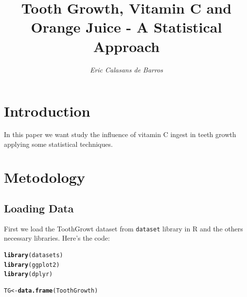 \documentclass[a4paper, 12pt]{article}\usepackage[]{graphicx}\usepackage[]{color}
\title{\textbf{Tooth Growth, Vitamin C and Orange Juice - A Statistical Approach}}
\author{\textit{Eric Calasans de Barros}}
\makeatletter
\newcommand{\hlstd}[1]{\textcolor[rgb]{0.345,0.345,0.345}{#1}}%
\newcommand{\hlkwb}[1]{\textcolor[rgb]{0.69,0.353,0.396}{#1}}%
\newcommand{\hlkwd}[1]{\textcolor[rgb]{0.737,0.353,0.396}{\textbf{#1}}}%
\newenvironment{kframe}{%
 \def\at@end@of@kframe{}%
 \ifinner\ifhmode%
  \def\at@end@of@kframe{\end{minipage}}%
  \begin{minipage}{\columnwidth}%
 \fi\fi%
 \def\FrameCommand##1{\hskip\@totalleftmargin \hskip-\fboxsep
 \colorbox{shadecolor}{##1}\hskip-\fboxsep
     \hskip-\linewidth \hskip-\@totalleftmargin \hskip\columnwidth}%
 \MakeFramed {\advance\hsize-\width
   \@totalleftmargin\z@ \linewidth\hsize
   \@setminipage}}%
 {\par\unskip\endMakeFramed%
 \at@end@of@kframe}
\newenvironment{knitrout}{}{} %
\makeatother
\begin{document}
        \maketitle
        \section{Introduction}
        In this paper we want study the influence of vitamin C ingest in teeth growth applying some statistical techniques.
        
        \section{Metodology}
        \subsection{Loading Data}
        First we load the ToothGrowt dataset from \texttt{dataset} library in R and the others necessary libraries.  Here's the code:
\begin{knitrout}\small
{}\color{fgcolor}\begin{kframe}
\begin{alltt}
\hlkwd{library}\hlstd{(datasets)}
\hlkwd{library}\hlstd{(ggplot2)}
\hlkwd{library}\hlstd{(dplyr)}

\hlstd{TG} \hlkwb{<-} \hlkwd{data.frame}\hlstd{(ToothGrowth)}
\end{alltt}
\end{kframe}
\end{knitrout}
\end{document}
